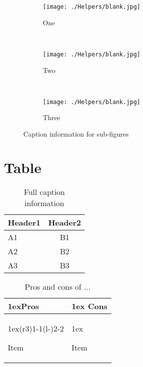 \begin{figure}[H]
    \centering

    \begin{subfigure}[b]{0.3\textwidth}
        \texttt{[image: ./Helpers/blank.jpg]}
         \caption{One} 
         \label{fig:referenceToFigure1a}
    \end{subfigure}
    ~
    \begin{subfigure}[b]{0.3\textwidth}
        \texttt{[image: ./Helpers/blank.jpg]}
        \caption{Two}
    \end{subfigure}
    ~
    \begin{subfigure}[b]{0.3\textwidth}
        \texttt{[image: ./Helpers/blank.jpg]}
         \caption{Three}
    \end{subfigure}
    \caption{Caption information for sub-figures} 
    \label{fig:referenceToFigure2}
\end{figure}


\section{Table}

\begin{table}[h]
	\centering
	\caption[Table info in LoT]{Full caption information}
	\label{tbl:referenceToTable1}
	\begin{tabularx}{0.5\textwidth}{X | c}
	\multicolumn{1}{c}{\textbf{Header1}} &  \multicolumn{1}{c}{\textbf{Header2}} \\ \hline
	  A1 & B1 \\
	  A2 & B2 \\
	  A3 & B3
	\end{tabularx}
\end{table}

\begin{table}[H]
	\caption{Pros and cons of ...}
	\label{tbl:referenceToTable2}
    \begin{tabularx}{\linewidth}{>{\parskip1ex}X@{\kern4\tabcolsep}>{\parskip1ex}X}
        \toprule
        \hfil\bfseries Pros
        &
        \hfil\bfseries Cons
        \\\cmidrule(r{3\tabcolsep}){1-1}\cmidrule(l{-\tabcolsep}){2-2}
        
        Item \par
        
        &
        
        Item \par
        
        \\\bottomrule
    \end{tabularx}
\end{table}


